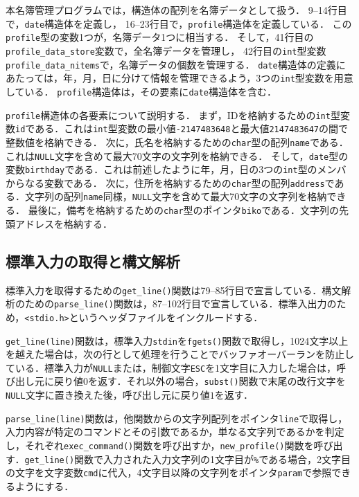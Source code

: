 本名簿管理プログラムでは，構造体の配列を名簿データとして扱う．
9--14行目で，\verb|date|構造体を定義し，
16--23行目で，\verb|profile|構造体を定義している．
この\verb|profile|型の変数1つが，名簿データ1つに相当する．
そして，41行目の\verb|profile_data_store|変数で，全名簿データを管理し，
42行目の\verb|int|型変数\verb|profile_data_nitems|で，名簿データの個数を管理する．
\verb|date|構造体の定義にあたっては，年，月，日に分けて情報を管理できるよう，3つの\verb|int|型変数を用意している．
\verb|profile|構造体は，その要素に\verb|date|構造体を含む．

\verb|profile|構造体の各要素について説明する．
まず，IDを格納するための\verb|int|型変数\verb|id|である．これは\verb|int|型変数の最小値\verb|-2147483648|と最大値\verb|2147483647|の間で整数値を格納できる．
次に，氏名を格納するための\verb|char|型の配列\verb|name|である．これは\verb|NULL|文字を含めて最大70文字の文字列を格納できる．
そして，\verb|date|型の変数\verb|birthday|である．これは前述したように年，月，日の3つの\verb|int|型のメンバからなる変数である．
次に，住所を格納するための\verb|char|型の配列\verb|address|である．文字列の配列\verb|name|同様，\verb|NULL|文字を含めて最大70文字の文字列を格納できる．
最後に，備考を格納するための\verb|char|型のポインタ\verb|biko|である．文字列の先頭アドレスを格納する．

\subsection{標準入力の取得と構文解析}

標準入力を取得するための\verb|get_line()|関数は79--85行目で宣言している．構文解析のための\verb|parse_line()|関数は，87--102行目で宣言している．標準入出力のため，\verb|<stdio.h>|というヘッダファイルをインクルードする．

\verb|get_line(line)|関数は，標準入力\verb|stdin|を\verb|fgets()|関数で取得し，1024文字以上を越えた場合は，次の行として処理を行うことでバッファオーバーランを防止している．標準入力が\verb|NULL|または，制御文字\verb|ESC|を1文字目に入力した場合は，呼び出し元に戻り値$0$を返す．それ以外の場合，\verb|subst()|関数で末尾の改行文字を\verb|NULL|文字に置き換えた後，呼び出し元に戻り値$1$を返す．

\verb|parse_line(line)|関数は，他関数からの文字列配列をポインタ\verb|line|で取得し，入力内容が特定のコマンドとその引数であるか，単なる文字列であるかを判定し，それぞれ\verb|exec_command()|関数を呼び出すか，\verb|new_profile()|関数を呼び出す．\verb|get_line()|関数で入力された入力文字列の1文字目が\verb|%|である場合，2文字目の文字を文字変数\verb|cmd|に代入，4文字目以降の文字列をポインタ\verb|param|で参照できるようにする．
